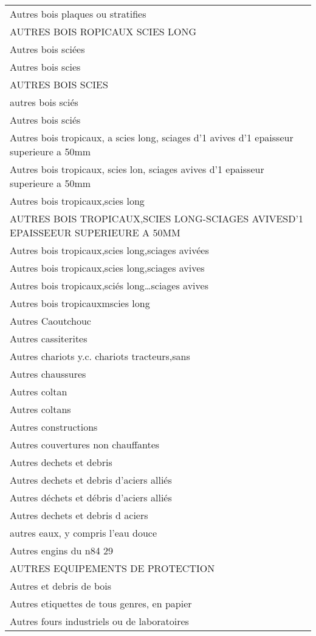 \documentclass[
]{book}
\begin{document}
\begin{longtable}[t]{l}
Autres bois plaques ou stratifies\\
AUTRES BOIS ROPICAUX SCIES LONG\\
Autres bois sciées\\
Autres bois scies\\
AUTRES BOIS SCIES\\
\addlinespace
autres bois sciés\\
Autres bois sciés\\
Autres bois tropicaux, a scies long, sciages d'1 avives d'1 epaisseur superieure a 50mm\\
Autres bois tropicaux, scies lon, sciages avives d'1 epaisseur superieure a 50mm\\
Autres bois tropicaux,scies long\\
\addlinespace
AUTRES BOIS TROPICAUX,SCIES LONG-SCIAGES AVIVESD'1 EPAISSEEUR SUPERIEURE A 50MM\\
Autres bois tropicaux,scies long,sciages avivées\\
Autres bois tropicaux,scies long,sciages avives\\
Autres bois tropicaux,sciés long…sciages avives\\
Autres bois tropicauxmscies long\\
\addlinespace
Autres Caoutchouc\\
Autres cassiterites\\
Autres chariots y.c. chariots tracteurs,sans\\
Autres chaussures\\
Autres coltan\\
\addlinespace
Autres coltans\\
Autres constructions\\
Autres couvertures non chauffantes\\
Autres dechets et debris\\
Autres dechets et debris d'aciers alliés\\
\addlinespace
Autres déchets et débris d'aciers alliés\\
Autres dechets et debris d aciers\\
autres eaux, y compris l'eau douce\\
Autres engins du n84 29\\
AUTRES EQUIPEMENTS DE PROTECTION\\
\addlinespace
Autres et debris de bois\\
Autres etiquettes de tous genres, en papier\\
Autres fours industriels ou de laboratoires\\

\end{longtable}
\end{document}
